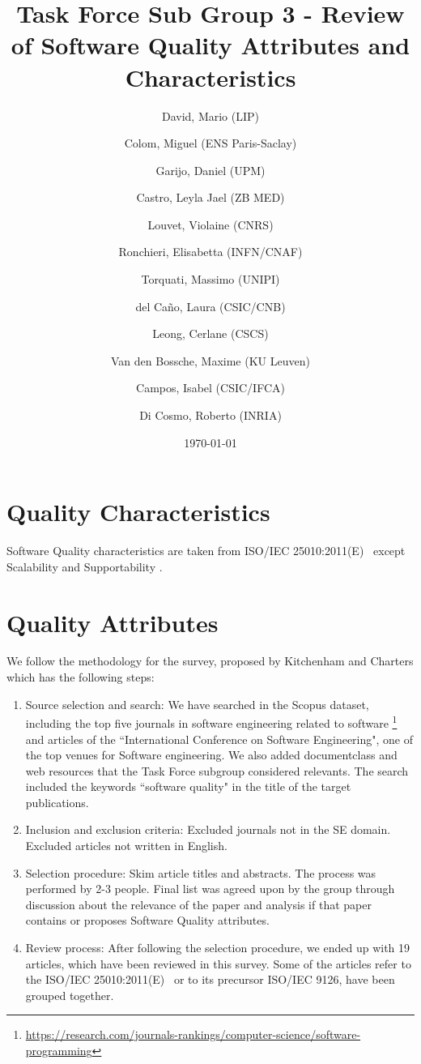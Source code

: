 \documentclass[a4paper]{article}
\title{Task Force Sub Group 3 - Review of Software Quality Attributes and Characteristics}
\author{
    David, Mario (LIP) \orcidlink{0000-0003-1802-5356} \and
    Colom, Miguel (ENS Paris-Saclay) \orcidlink{0000-0003-2636-0656} \and
    Garijo, Daniel (UPM) \orcidlink{0000-0003-0454-7145} \and
    Castro, Leyla Jael (ZB MED) \orcidlink{0000-0003-3986-0510} \and
    Louvet, Violaine (CNRS) \orcidlink{0000-0002-8742-8952} \and
    Ronchieri, Elisabetta (INFN/CNAF) \orcidlink{0000-0002-7341-6491} \and
    Torquati, Massimo (UNIPI) \orcidlink{0000-0001-6323-3459} \and
    del Ca\~{n}o, Laura (CSIC/CNB) \orcidlink{0000-0003-0981-2040} \and
    Leong, Cerlane (CSCS)  \orcidlink{0000-0001-8241-6277} \and
    Van den Bossche, Maxime (KU Leuven) \orcidlink{0000-0002-0938-0156} \and
    Campos, Isabel (CSIC/IFCA) \orcidlink{0000-0002-9350-0383} \and
    Di Cosmo, Roberto (INRIA) \orcidlink{0000-0002-7493-5349}
}
\date{\today}
\begin{document}
\maketitle
\tableofcontents

\newpage
\section{Quality Characteristics}

Software Quality characteristics are taken from ISO/IEC 25010:2011(E)~\cite{iso_25010_2011_2017} except Scalability and
Supportability \cite{microsoft_2010}.



\newpage
\section{Quality Attributes}

We follow the methodology for the survey, proposed by Kitchenham and Charters \cite{keele2007guidelines} which has the following steps:

\begin{enumerate}
    \item Source selection and search: We have searched in the Scopus dataset, including the top five journals in
    software engineering related to software \footnote{\url{https://research.com/journals-rankings/computer-science/software-programming}}
    and articles of the  ``International Conference on Software Engineering", one of the top venues for Software engineering. We also added documentclass
    and web resources that the Task Force subgroup considered relevants.
    The search included the keywords ``software quality" in the title of the target publications.
    \item Inclusion and exclusion criteria: Excluded journals not in the SE domain. Excluded articles not written in English.
    \item Selection procedure: Skim article titles and abstracts. The process was performed by 2-3 people. Final list was agreed upon by the group through discussion
    about the relevance of the paper and analysis if that paper contains or proposes Software Quality attributes.
    \item Review process: After following the selection procedure, we ended up with 19 articles, which have been reviewed in this survey. Some of the articles
    refer to the ISO/IEC 25010:2011(E)~\cite{iso_25010_2011_2017} or to its precursor ISO/IEC 9126, have been grouped together.
\end{enumerate}
\end{document}
